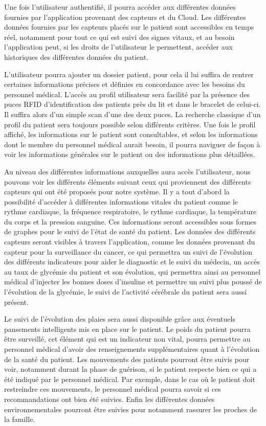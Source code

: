 Une fois l’utilisateur authentifié, il pourra accéder aux différentes données fournies par l’application provenant des capteurs et
du Cloud. Les différentes données fournies par les capteurs placés sur le patient sont accessibles en temps réel, notamment pour
tout ce qui est suivi des signes vitaux, et au besoin l’application peut, si les droits de l’utilisateur le permettent, accéder
aux historiques des différentes données du patient.

L’utilisateur pourra ajouter un dossier patient, pour cela il lui suffira de rentrer certaines informations précises et définies en concordance avec les besoins du personnel médical. L’accès au profil utilisateur sera facilité par la présence des puces RFID d’identification des patients près du lit et dans le bracelet de celui-ci. Il suffira alors d’un simple scan d’une des deux puces. La recherche classique d’un profil du patient sera toujours possible selon différents critères. Une fois le profil affiché, les informations sur le patient sont consultables, et selon les informations dont le membre du personnel médical aurait besoin, il pourra naviguer de façon à voir les informations générales sur le patient ou des informations plus détaillées.

Au niveau des différentes informations auxquelles aura accès l’utilisateur, nous pouvons voir les différents éléments suivant ceux qui
proviennent des différents capteurs qui ont été proposés pour notre système. Il y a tout d’abord la possibilité d’accéder à
différentes informations vitales du patient comme le rythme cardiaque, la fréquence respiratoire, le rythme cardiaque, la
température du corps et la pression sanguine. Ces informations seront accessibles sous formes de graphes pour le suivi de l’état
de santé du patient. Les données des différents capteurs seront visibles à travers l’application, comme les données provenant du capteur pour la surveillance du cancer, ce qui permettra un suivi de l’évolution des différents indicateurs pour aider le diagnostic et le suivi du médecin, un accès au taux de glycémie du patient et son évolution, qui permettra ainsi au personnel médical d’injecter les bonnes doses d’insuline et permettre un suivi plus poussé de l’évolution de la glycémie, le suivi de l’activité cérébrale du patient sera aussi présent.

Le suivi de l’évolution des plaies sera aussi disponible grâce aux éventuels pansements intelligents mis en place sur le patient.
Le poids du patient pourra être surveillé, cet élément qui est un indicateur non vital, pourra permettre au personnel médical
d’avoir des renseignements supplémentaires quant à l’évolution de la santé du patient. Les mouvements des patients pourront être
suivis pour voir, notamment durant la phase de guérison, si le patient respecte bien ce qui a été indiqué par le personnel
médical. Par exemple, dans le cas où le patient doit restreindre ces mouvements, le personnel médical pourra savoir si ces
recommandations ont bien été suivies. Enfin les différentes données environnementales pourront être suivies pour notamment rassurer
les proches de la famille.

